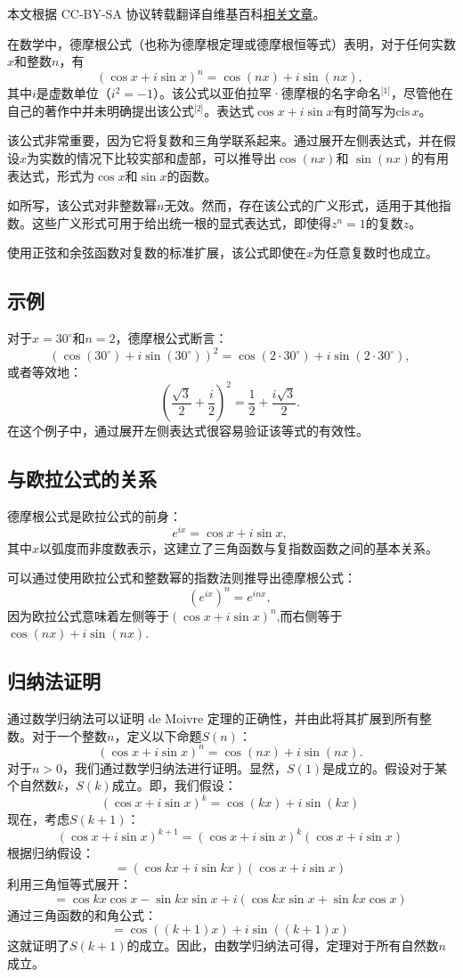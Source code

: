 
本文根据 CC-BY-SA 协议转载翻译自维基百科\href{https://en.wikipedia.org/wiki/Laplace\%27s_equation}{相关文章}。

在数学中，德摩根公式（也称为德摩根定理或德摩根恒等式）表明，对于任何实数\( x \)和整数\( n \)，有
\[
(\cos x + i \sin x)^n = \cos(nx) + i \sin(nx),~
\]
其中\( i \)是虚数单位（\( i^2 = -1 \)）。该公式以亚伯拉罕·德摩根的名字命名\(^\text{[1]}\)，尽管他在自己的著作中并未明确提出该公式\(^\text{[2]}\)。表达式\( \cos x + i \sin x \)有时简写为\( \text{cis} \, x \)。

该公式非常重要，因为它将复数和三角学联系起来。通过展开左侧表达式，并在假设\( x \)为实数的情况下比较实部和虚部，可以推导出\( \cos(nx) \)和 \( \sin(nx) \)的有用表达式，形式为\( \cos x \)和\( \sin x \)的函数。

如所写，该公式对非整数幂\( n \)无效。然而，存在该公式的广义形式，适用于其他指数。这些广义形式可用于给出统一根的显式表达式，即使得\( z^n = 1 \)的复数\( z \)。

使用正弦和余弦函数对复数的标准扩展，该公式即使在\( x \)为任意复数时也成立。
\subsection{示例}  
对于\( x = 30^\circ \)和\( n = 2 \)，德摩根公式断言：
\[
\left( \cos(30^\circ) + i \sin(30^\circ) \right)^2 = \cos(2 \cdot 30^\circ) + i \sin(2 \cdot 30^\circ),~
\]
或者等效地：
\[
\left( \frac{\sqrt{3}}{2} + \frac{i}{2} \right)^2 = \frac{1}{2} + \frac{i \sqrt{3}}{2}.~
\]
在这个例子中，通过展开左侧表达式很容易验证该等式的有效性。

\subsection{与欧拉公式的关系}  
德摩根公式是欧拉公式的前身：
\[
e^{ix} = \cos x + i \sin x,~
\]
其中\( x \)以弧度而非度数表示，这建立了三角函数与复指数函数之间的基本关系。

可以通过使用欧拉公式和整数幂的指数法则推导出德摩根公式：
\[
(e^{ix})^n = e^{inx},~
\]
因为欧拉公式意味着左侧等于\(\left( \cos x + i \sin x \right)^n\),而右侧等于\(\cos(nx) + i \sin(nx)\).
\subsection{归纳法证明}
通过数学归纳法可以证明 de Moivre 定理的正确性，并由此将其扩展到所有整数。对于一个整数\( n \)，定义以下命题\( S(n) \)：
\[
(\cos x + i \sin x)^n = \cos(nx) + i \sin(nx).~
\]
对于\( n > 0 \)，我们通过数学归纳法进行证明。显然，\( S(1) \)是成立的。假设对于某个自然数\( k \)，\( S(k) \)成立。即，我们假设：
\[
(\cos x + i \sin x)^k = \cos(kx) + i \sin(kx)~
\]
现在，考虑\( S(k+1) \)：
\[
(\cos x + i \sin x)^{k+1} = (\cos x + i \sin x)^k (\cos x + i \sin x)~
\]
根据归纳假设：
\[
= (\cos kx + i \sin kx) (\cos x + i \sin x)~
\]
利用三角恒等式展开：
\[
= \cos kx\cos x - \sin kx\sin x + i(\cos kx\sin x + \sin kx\cos x)~
\]
通过三角函数的和角公式：
\[
= \cos((k+1)x) + i \sin((k+1)x)~
\]
这就证明了\( S(k+1) \)的成立。因此，由数学归纳法可得，定理对于所有自然数\( n \)成立。

